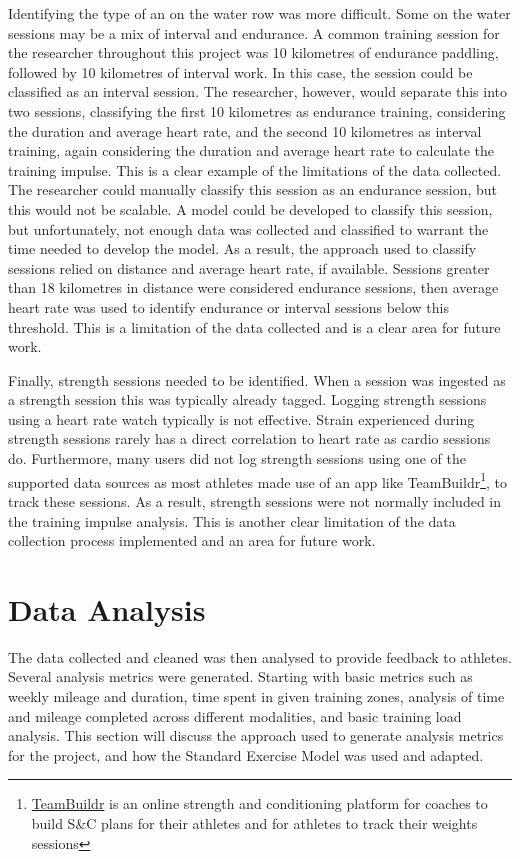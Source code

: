 Identifying the type of an on the water row was more difficult. Some on the water sessions may be a mix of interval and endurance. A common training session for the researcher throughout this project was 10 kilometres of endurance paddling, followed by 10 kilometres of interval work. In this case, the session could be classified as an interval session. The researcher, however, would separate this into two sessions, classifying the first 10 kilometres as endurance training, considering the duration and average heart rate, and the second 10 kilometres as interval training, again considering the duration and average heart rate to calculate the training impulse. This is a clear example of the limitations of the data collected. The researcher could manually classify this session as an endurance session, but this would not be scalable. A model could be developed to classify this session, but unfortunately, not enough data was collected and classified to warrant the time needed to develop the model. As a result, the approach used to classify sessions relied on distance and average heart rate, if available. Sessions greater than 18 kilometres in distance were considered endurance sessions, then average heart rate was used to identify endurance or interval sessions below this threshold. This is a limitation of the data collected and is a clear area for future work.

Finally, strength sessions needed to be identified. When a session was ingested as a strength session this was typically already tagged. Logging strength sessions using a heart rate watch typically is not effective. Strain experienced during strength sessions rarely has a direct correlation to heart rate as cardio sessions do. Furthermore, many users did not log strength sessions using one of the supported data sources as most athletes made use of an app like TeamBuildr\footnote{\href{https://www.teambuildr.com/}{TeamBuildr} is an online strength and conditioning platform for coaches to build S\&C plans for their athletes and for athletes to track their weights sessions}, to track these sessions. As a result, strength sessions were not normally included in the training impulse analysis.  This is another clear limitation of the data collection process implemented and an area for future work. 

\section{\label{sec:data-anyl}Data Analysis}
The data collected and cleaned was then analysed to provide feedback to athletes. Several analysis metrics were generated. Starting with basic metrics such as weekly mileage and duration, time spent in given training zones, analysis of time and mileage completed across different modalities, and basic training load analysis. This section will discuss the approach used to generate analysis metrics for the project, and how the Standard Exercise Model was used and adapted.

